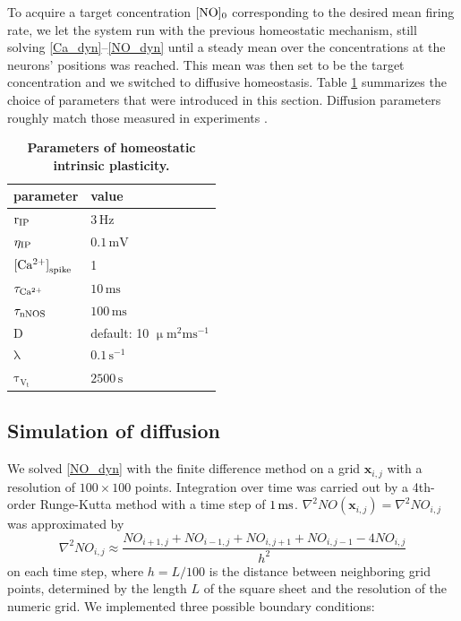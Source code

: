 \documentclass[10pt,letterpaper]{article}
\begin{document}
To acquire a target concentration $\rm [NO]_0$ corresponding to the desired mean firing rate, we let the system run with the previous homeostatic mechanism, still solving \eqref{Ca_dyn}--\eqref{NO_dyn} until a steady mean over the concentrations at the neurons' positions was reached. This mean was then set to be the target concentration and we switched to diffusive homeostasis. Table \ref{Params_IP} summarizes the choice of parameters that were introduced in this section. Diffusion parameters roughly match those measured in experiments \cite{Philippides_2000}.
\begin{table}
\caption{\bf Parameters of homeostatic intrinsic plasticity.}
\begin{tabular}{|l|l|}
\hline
\textbf{parameter} & \textbf{value} \\
\hline
$\mathrm{r_{\rm IP}}$ & $\mathrm{3\,Hz}$ \\
\hline
$\mathrm{\eta_{\rm IP}}$ & $\mathrm{0.1\,mV}$ \\
\hline
${\rm [Ca^{2+}]}_{\rm spike}$ & 1 \\ \hline
$\mathrm{\tau_{\rm Ca^{2+}}}$ &  $\mathrm{10\,ms}$ \\
\hline
$\mathrm{\tau_{\rm nNOS}}$ & $\mathrm{100\,ms}$ \\
\hline
$\mathrm{D}$ & default: 10 $\mathrm{\upmu m^2 ms^{-1}}$ \\
\hline 
$\mathrm{\lambda}$ & $\mathrm{0.1\,s^{-1}}$ \\
\hline
$\mathrm{\tau_{V_t}}$ & $\mathrm{2500\,s}$ \\
\hline
\end{tabular}
\label{Params_IP}
\end{table}

\subsection*{Simulation of diffusion}
We solved \eqref{NO_dyn} with the finite difference method on a grid $\mathbf{x}_{i,j}$ with a resolution of $100\times 100$ points. Integration over time was carried out by a 4th-order Runge-Kutta method with a time step of $\rm 1\, ms$. $\nabla^2 NO(\mathbf{x}_{i,j}) = \nabla^2 NO_{i,j}$ was approximated by
\begin{equation}
\nabla^2 NO_{i,j} \approx \frac{NO_{i+1,j}+NO_{i-1,j}+NO_{i,j+1}+NO_{i,j-1}-4NO_{i,j}}{h^2}
\label{Laplace_Numeric}
\end{equation}
on each time step, where $h = L/100$ is the distance between neighboring grid points, determined by the length $L$ of the square sheet and the resolution of the numeric grid. We implemented three possible boundary conditions:
\end{document}
